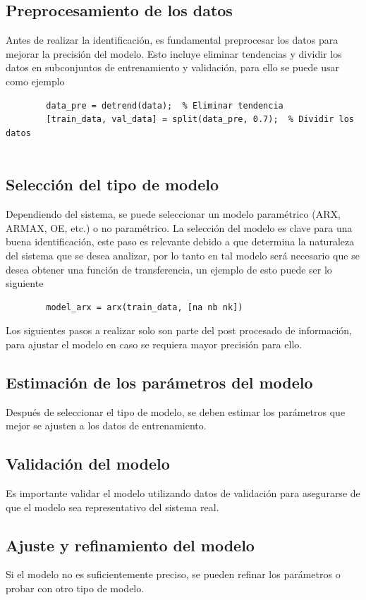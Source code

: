\documentclass[conference]{IEEEtran}
\begin{document}
	\subsection{Preprocesamiento de los datos}
	Antes de realizar la identificación, es fundamental preprocesar los datos para mejorar la precisión del modelo. Esto incluye eliminar tendencias y dividir los datos en subconjuntos de entrenamiento y validación, para ello se puede usar como ejemplo
	
	\begin{lstlisting}
		data_pre = detrend(data);  % Eliminar tendencia
		[train_data, val_data] = split(data_pre, 0.7);  % Dividir los datos
		
	\end{lstlisting}
	
	\subsection{Selección del tipo de modelo}
	Dependiendo del sistema, se puede seleccionar un modelo paramétrico (ARX, ARMAX, OE, etc.) o no paramétrico. La selección del modelo es clave para una buena identificación, este paso es relevante debido a que determina la naturaleza del sistema que se desea analizar, por lo tanto en tal modelo será necesario que se desea obtener una función de transferencia, un ejemplo de esto puede ser lo siguiente 
	\begin{lstlisting}
		model_arx = arx(train_data, [na nb nk])
	\end{lstlisting}
	
	Los siguientes pasos a realizar solo son parte del post procesado de información, para ajustar el modelo en caso se requiera mayor precisión para ello.
	
	\subsection{Estimación de los parámetros del modelo}
	Después de seleccionar el tipo de modelo, se deben estimar los parámetros que mejor se ajusten a los datos de entrenamiento.
	
	\subsection{Validación del modelo}
	Es importante validar el modelo utilizando datos de validación para asegurarse de que el modelo sea representativo del sistema real.
	
	\subsection{Ajuste y refinamiento del modelo}
	Si el modelo no es suficientemente preciso, se pueden refinar los parámetros o probar con otro tipo de modelo.
	
\end{document}
